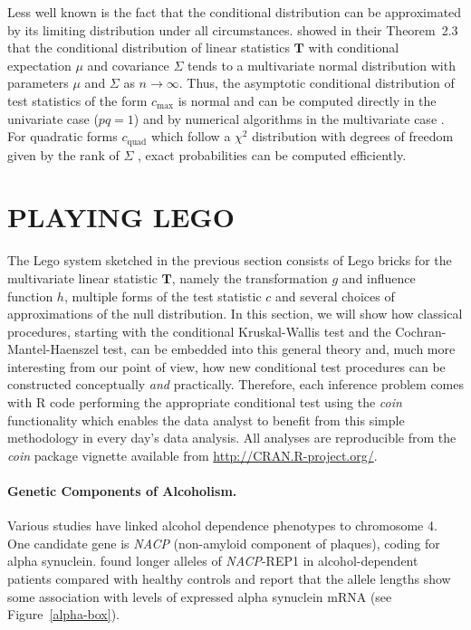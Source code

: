 \documentclass{article}
\newcommand{\Rpackage}[1]{\textit{#1}}
\newcommand{\RR}{\textsf{R}}
\newcommand{\T}{\mathbf{T}}
\begin{document}
Less well known is the fact that 
the conditional distribution can be approximated by its limiting distribution
under all circumstances. \cite{StrasserWeber1999} showed in their Theorem~2.3 that the   
conditional distribution of linear statistics $\T$ with conditional    
expectation $\mu$ and covariance $\Sigma$ tends to a multivariate normal
distribution with parameters $\mu$ and $\Sigma$ as $n \rightarrow
\infty$. Thus, the asymptotic conditional distribution of test statistics of
the form $c_\text{max}$ is normal and
can be computed directly in the univariate case ($pq = 1$) and by numerical 
algorithms in the multivariate case \citep[e.g., using the quasi-randomized
Monte-Carlo procedures of][]{numerical-:1992}.
For quadratic forms
$c_\text{quad}$ which follow a $\chi^2$ distribution with degrees of freedom
given by the rank of $\Sigma$ \citep[e.g.~Theorem 6.20, ][]{Rasch1995}, exact
probabilities can be computed efficiently.

\section{PLAYING LEGO \label{play}}

The Lego system sketched in the previous section consists of Lego bricks for 
the multivariate linear statistic $\T$, namely the transformation $g$ and
influence function $h$, multiple forms of the test statistic $c$ and several choices
of approximations of the null distribution. In this section, we will show how
classical procedures, starting with the conditional Kruskal-Wallis test and
the Cochran-Mantel-Haenszel test, can be embedded into this general theory
and, much more interesting from our point of view, how new conditional test
procedures can be constructed conceptually \textit{and} practically. 
Therefore, each inference problem comes with \RR{} code performing the
appropriate conditional test using the \Rpackage{coin} functionality 
which enables the data analyst to benefit from this
simple methodology in every day's data analysis. All analyses are
reproducible from the \Rpackage{coin} package vignette available from
\url{http://CRAN.R-project.org/}.

\paragraph{Genetic Components of Alcoholism.}

Various studies have linked alcohol dependence phenotypes to chromosome 4.  
One candidate gene is \textit{NACP} (non-amyloid component of plaques), 
coding for alpha synuclein. 
\cite{Boenscheta2005} found longer alleles of
\textit{NACP}-REP1 in alcohol-dependent patients compared with healthy controls
and report that the allele lengths show some
association with levels of expressed alpha synuclein mRNA (see
Figure~\ref{alpha-box}).
\end{document}
